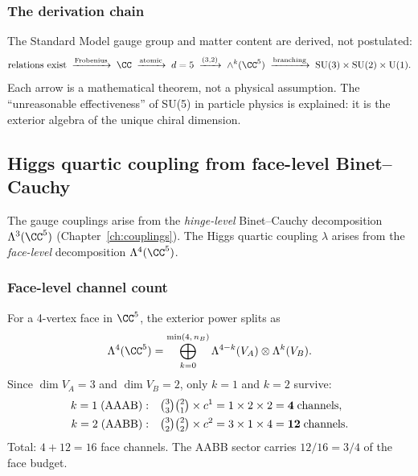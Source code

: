 \subsubsection{The derivation chain}

The Standard Model gauge group and matter content are derived, not postulated:
\begin{equation}
\text{relations exist} \;\xrightarrow{\text{Frobenius}}\; \CC \;\xrightarrow{\text{atomic}}\; d = 5 \;\xrightarrow{(3,2)}\; \wedge^k(\CC^5) \;\xrightarrow{\text{branching}}\; \text{SU}(3) \times \text{SU}(2) \times \text{U}(1).
\end{equation}
Each arrow is a mathematical theorem, not a physical assumption.  The ``unreasonable effectiveness'' of SU(5) in particle physics is explained: it is the exterior algebra of the unique chiral dimension.

\subsection{Higgs quartic coupling from face-level Binet--Cauchy}
\label{sec:higgs_quartic}

The gauge couplings arise from the \emph{hinge-level} Binet--Cauchy decomposition $\Lambda^3(\CC^5)$ (Chapter~\ref{ch:couplings}).  The Higgs quartic coupling $\lambda$ arises from the \emph{face-level} decomposition $\Lambda^4(\CC^5)$.

\subsubsection{Face-level channel count}

For a 4-vertex face in $\CC^5$, the exterior power splits as
\begin{equation}
\Lambda^4(\CC^5) = \bigoplus_{k=0}^{\min(4,\,n_B)} \Lambda^{4-k}(V_A) \otimes \Lambda^k(V_B).
\end{equation}
Since $\dim V_A = 3$ and $\dim V_B = 2$, only $k = 1$ and $k = 2$ survive:
\begin{align}
k = 1\;(\text{AAAB}):&\quad \tbinom{3}{3}\tbinom{2}{1}\times c^1 = 1 \times 2 \times 2 = \mathbf{4}\;\text{channels}, \\
k = 2\;(\text{AABB}):&\quad \tbinom{3}{2}\tbinom{2}{2}\times c^2 = 3 \times 1 \times 4 = \mathbf{12}\;\text{channels}.
\end{align}
Total: $4 + 12 = 16$ face channels.  The AABB sector carries $12/16 = 3/4$ of the face budget.

